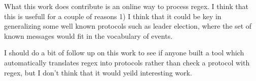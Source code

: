 What this work does contribute is an online way to process regex. I think that
this is usefull for a couple of reasons 1) I think that it could be key in
generalizing some well known protocols such as leader election, where the set
of known messages would fit in the vocabulary of events.

I should do a bit of follow up on this work to see if anyone built a tool which
automatically translates regex into protocols rather than check a protocol with
regex, but I don't think that it would yeild interesting work.



